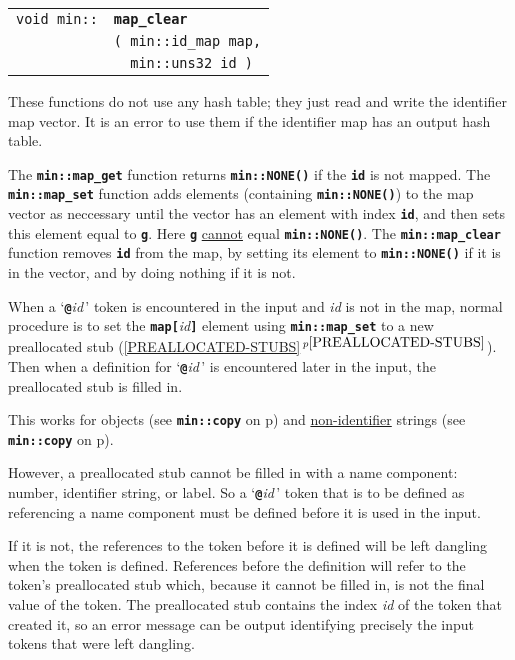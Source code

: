 \documentclass[12pt]{article}
\makeatletter
\newcommand{\TT}[1]{{\tt \bfseries #1}}
\newcommand{\ttmindex}[2]{\index{#1@{\tt #1}!#2}}
\newcommand{\itemref}[1]{\ref{#1}$\,^{p\pageref{#1}}$}
\newcommand{\pagref}[1]{p\pageref{#1}}
\newcommand{\EOL}{\penalty \exhyphenpenalty}
\newenvironment{indpar}[1][0.3in]%
	{\begin{list}{}%
		     {\setlength{\itemsep}{0in}%
		      \setlength{\topsep}{0in}%
		      \setlength{\parsep}{1ex}%
		      \setlength{\labelwidth}{#1}%
		      \setlength{\leftmargin}{#1}%
		      \addtolength{\leftmargin}{\labelsep}}%
	 \item}%
	{\end{list}}
\newcommand{\LABEL}[1]{\label{#1}}
\newlength{\ARGBREAKLENGTH}
\newcommand{\ARGBREAK}[1][\ARGBREAKLENGTH]{\\&\hspace*{#1}}
\newcommand{\MINMKEY}[2]%
           {\TT{#1}\ttmindex{min::#1}{#2}\ttmindex{#1}{#2}}
\makeatother
\begin{document}
\begin{indpar}[1em]\begin{tabular}{r@{}l}
\verb|void min::| & \MINMKEY{map\_clear}{of numeric id map}\ARGBREAK
    \verb|( min::id_map map,|\ARGBREAK
    \verb|  min::uns32 id )|
\LABEL{MIN::MAP_CLEAR_OF_ID_MAP_ID} \\
\end{tabular}\end{indpar}

These functions do not use any hash table; they just read and
write the identifier map vector.  It is an error to use them if
the identifier map has an output hash table.

The \TT{min::map\_get} function returns \TT{min::NONE()} if the \TT{id}
is not mapped.  The \TT{min::map\_\EOL set} function adds elements
(containing \TT{min::NONE()}) to the map vector as neccessary
until the vector has an element with index \TT{id}, and then
sets this element equal to \TT{g}.  Here \TT{g} \underline{cannot}
equal \TT{min::NONE()}.  The \TT{min::map\_clear} function removes
\TT{id} from the map, by setting its element to \TT{min::NONE()}
if it is in the vector, and by doing nothing if it is not.

When a `\TT{@}{\em id}\,' token is encountered in the input
and {\em id} is not in the map, normal procedure is
to set the \TT{map[}{\em id}\TT{]} element using \TT{min::map\_set}
to a new preallocated stub (\itemref{PREALLOCATED-STUBS}).
Then when a definition for
`\TT{@}{\em id}\,' is encountered later in the input, the preallocated
stub is filled in.

This works for objects (see \TT{min::copy} on
\pagref{MIN::PREALLOCATED_COPY_UNUSED})
and \underline{non-identifier} strings
(see \TT{min::copy} on \pagref{MIN::COPY_STR_TO_PREALLOCATED}).

However, a preallocated stub cannot be filled in with a
name component: number, identifier string, or label.
So a `\TT{@}{\em id}\,' token that is to be defined as
referencing a name component must be defined before it is
used in the input.

If it is not, the references to the token
before it is defined will be left dangling when the token is defined.
References before the definition will refer to the token's preallocated
stub which, because it cannot be filled in, is not the final value
of the token.  The preallocated stub contains the index {\em id}
of the token that created it, so an error message
can be output identifying precisely the input tokens that were
left dangling.
\end{document}
